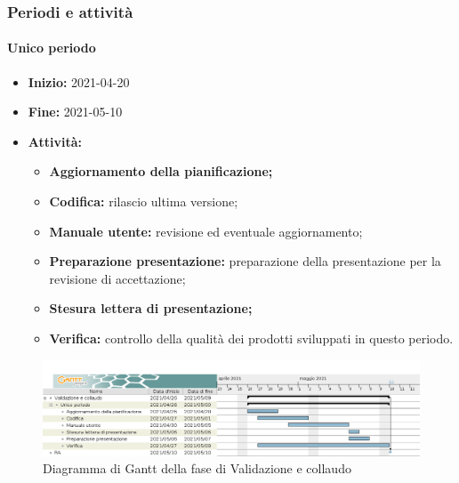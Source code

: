 \subsubsection{Periodi e attività}

\paragraph[Unico periodo]{Unico periodo}
\begin{itemize}
    \item [] \textbf{Inizio:} 2021-04-20
    \item [] \textbf{Fine:} 2021-05-10
    \item [] \textbf{Attività:}
          \begin{itemize}
              \item \textbf{Aggiornamento della pianificazione;}
              \item \textbf{Codifica:} rilascio ultima versione;
              \item \textbf{Manuale utente:} revisione ed eventuale aggiornamento;
              \item \textbf{Preparazione presentazione:} preparazione della presentazione per la revisione di accettazione;
              \item \textbf{Stesura lettera di presentazione;}
              \item \textbf{Verifica:} controllo della qualità dei prodotti sviluppati in questo periodo.
          \end{itemize}
\end{itemize}

\begin{figure}[H]
    \centering
    \includegraphics[width=1\linewidth]{res/images/pianificazione/validazione_e_collaudo.png}
    \caption{Diagramma di Gantt della fase di Validazione e collaudo}
    \label{fig:_Gantt Validazione e collaudo}
\end{figure}

